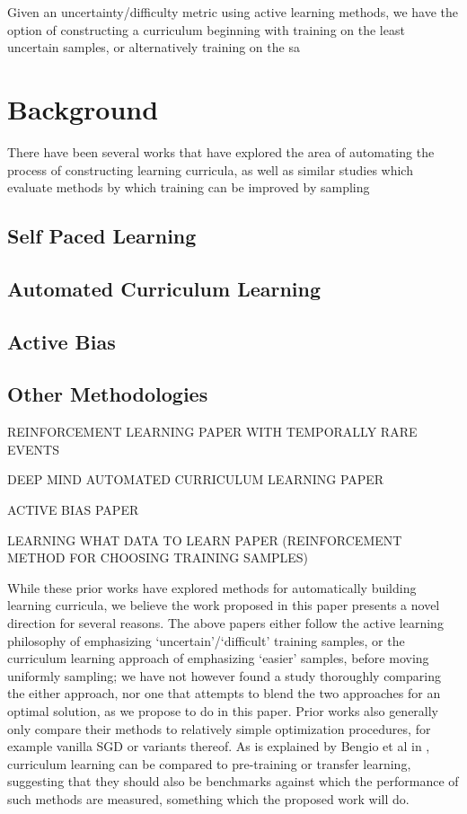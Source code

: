 \documentclass[a4paper,11pt]{article}
\begin{document}
Given an uncertainty/difficulty metric using active learning methods, we have the option of constructing a curriculum beginning with training on the least uncertain samples, or alternatively training on the sa 

\section{Background}
There have been several works that have explored the area of automating the process of constructing learning curricula, as well as similar studies which evaluate methods by which training can be improved by sampling 

\subsection*{Self Paced Learning}

\subsection*{Automated Curriculum Learning}

\subsection*{Active Bias}

\subsection*{Other Methodologies}

REINFORCEMENT LEARNING PAPER WITH TEMPORALLY RARE EVENTS

DEEP MIND AUTOMATED CURRICULUM LEARNING PAPER

ACTIVE BIAS PAPER

LEARNING WHAT DATA TO LEARN PAPER (REINFORCEMENT METHOD FOR CHOOSING TRAINING SAMPLES)

While these prior works have explored methods for automatically building learning curricula, we believe the work proposed in this paper presents a novel direction for several reasons. The above papers either follow the active learning philosophy of emphasizing `uncertain'/`difficult' training samples, or the curriculum learning approach of emphasizing `easier' samples, before moving uniformly sampling; we have not however found a study thoroughly comparing the either approach, nor one that attempts to blend the two approaches for an optimal solution, as we propose to do in this paper. Prior works also generally only compare their methods to relatively simple optimization procedures, for example vanilla SGD or variants thereof. As is explained by Bengio et al in \cite{Bengio 09}, curriculum learning can be compared to pre-training or transfer learning, suggesting that they should also be benchmarks against which the performance of such methods are measured, something which the proposed work will do. 
\end{document}
